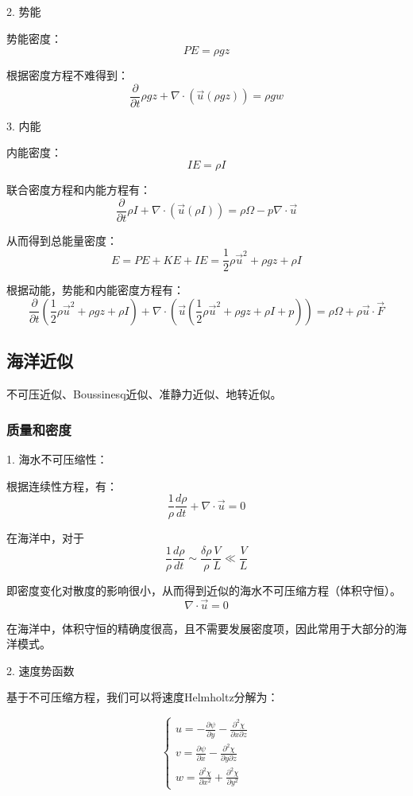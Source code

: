\documentclass{article}
\begin{document}
2. 势能

势能密度：
$$PE = \rho gz$$

根据密度方程不难得到：
$$\frac{\partial}{\partial t} \rho gz
+ \nabla\cdot\left(\vec{u}(\rho gz)\right)
=\rho gw $$

3. 内能

内能密度：
$$IE = \rho I$$

联合密度方程和内能方程有：
$$\frac{\partial}{\partial t} \rho I
+ \nabla\cdot(\vec{u}(\rho I))
=\rho\Omega - p\nabla\cdot\vec{u}$$

从而得到总能量密度：
$$E = PE+KE+IE=\frac{1}{2}\rho\vec{u}^2+\rho gz+\rho I$$

根据动能，势能和内能密度方程有：
$$\frac{\partial}{\partial t} (\frac{1}{2}\rho\vec{u}^2+\rho gz+\rho I)
+\nabla\cdot\left(\vec{u}(\frac{1}{2}\rho\vec{u}^2+\rho gz+\rho I+p)\right)
=\rho \Omega + \rho\vec{u}\cdot\vec{F}$$




\subsection{海洋近似}
不可压近似、Boussinesq近似、准静力近似、地转近似。

\subsubsection{质量和密度}
1. 海水不可压缩性：

根据连续性方程，有：
$$\frac{1}{\rho}\frac{d\rho}{dt}+\nabla\cdot\vec{u}=0$$

在海洋中，对于$$\frac{1}{\rho}\frac{d\rho}{dt}\sim\frac{\delta \rho}{\rho}\frac{V}{L} \ll \frac{V}{L}$$

即密度变化对散度的影响很小，从而得到近似的海水不可压缩方程（体积守恒）。
$$\nabla\cdot\vec{u}=0$$

在海洋中，体积守恒的精确度很高，且不需要发展密度项，因此常用于大部分的海洋模式。

2. 速度势函数

基于不可压缩方程，我们可以将速度Helmholtz分解为：

$$\begin{cases}
u = -\frac{\partial\psi}{\partial y}-\frac{\partial^2 \chi}{\partial x\partial z}\\
v = \frac{\partial\psi}{\partial x}-\frac{\partial^2 \chi}{\partial y\partial z}\\
w = \frac{\partial^2 \chi}{\partial x^2} + \frac{\partial^2 \chi}{\partial y^2}
\end{cases}$$
\end{document}
